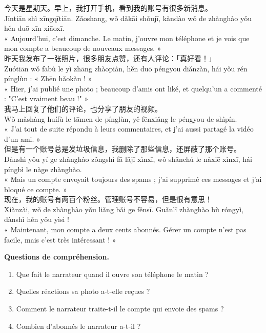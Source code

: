 \documentclass[11pt]{article}
\begin{document}
\begin{textebox}
今天是星期天。早上，我打开手机，看到我的账号有很多新消息。\\
Jīntiān shì xīngqītiān. Zǎoshang, wǒ dǎkāi shǒujī, kàndào wǒ de zhànghào yǒu hěn duō xīn xiāoxī.\\
« Aujourd'hui, c'est dimanche. Le matin, j'ouvre mon téléphone et je vois que mon compte a beaucoup de nouveaux messages. »\\[4pt]
昨天我发布了一张照片，很多朋友点赞，还有人评论：「真好看！」\\
Zuótiān wǒ fābù le yì zhāng zhàopiàn, hěn duō péngyou diǎnzàn, hái yǒu rén pínglùn : « Zhēn hǎokàn ! »\\
« Hier, j'ai publié une photo ; beaucoup d'amis ont liké, et quelqu'un a commenté : "C'est vraiment beau !" »\\[4pt]
我马上回复了他们的评论，也分享了朋友的视频。\\
Wǒ mǎshàng huífù le tāmen de pínglùn, yě fēnxiǎng le péngyou de shìpín.\\
« J'ai tout de suite répondu à leurs commentaires, et j'ai aussi partagé la vidéo d'un ami. »\\[4pt]
但是有一个账号总是发垃圾信息，我删除了那些信息，还屏蔽了那个账号。\\
Dànshì yǒu yí ge zhànghào zǒngshì fā lājī xìnxī, wǒ shānchú le nàxiē xìnxī, hái píngbì le nàge zhànghào.\\
« Mais un compte envoyait toujours des spams ; j'ai supprimé ces messages et j'ai bloqué ce compte. »\\[4pt]
现在，我的账号有两百个粉丝。管理账号不容易，但是很有意思！\\
Xiànzài, wǒ de zhànghào yǒu liǎng bǎi ge fěnsī. Guǎnlǐ zhànghào bù róngyì, dànshì hěn yǒu yìsi !\\
« Maintenant, mon compte a deux cents abonnés. Gérer un compte n'est pas facile, mais c'est très intéressant ! »
\end{textebox}

\textbf{Questions de compréhension.}
\begin{enumerate}
\item Que fait le narrateur quand il ouvre son téléphone le matin ?
\item Quelles réactions sa photo a-t-elle reçues ?
\item Comment le narrateur traite-t-il le compte qui envoie des spams ?
\item Combien d'abonnés le narrateur a-t-il ?
\end{enumerate}
\end{document}

